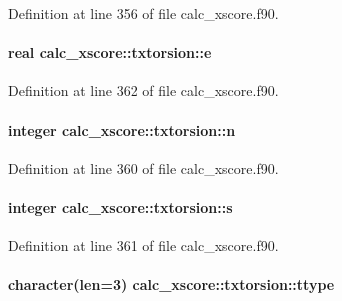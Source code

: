 Definition at line 356 of file calc\-\_\-xscore.\-f90.

\hypertarget{structcalc__xscore_1_1txtorsion_a9902e7ce0a1b1a905386ad7004774b2b}{
\paragraph[{e}]{\setlength{\rightskip}{0pt plus 5cm}real calc\-\_\-xscore\-::txtorsion\-::e}}\label{structcalc__xscore_1_1txtorsion_a9902e7ce0a1b1a905386ad7004774b2b}


Definition at line 362 of file calc\-\_\-xscore.\-f90.

\hypertarget{structcalc__xscore_1_1txtorsion_af40518b8daaef5dd86b51c55408a87e3}{
\paragraph[{n}]{\setlength{\rightskip}{0pt plus 5cm}integer calc\-\_\-xscore\-::txtorsion\-::n}}\label{structcalc__xscore_1_1txtorsion_af40518b8daaef5dd86b51c55408a87e3}


Definition at line 360 of file calc\-\_\-xscore.\-f90.

\hypertarget{structcalc__xscore_1_1txtorsion_a99e0387c10d669d8c749ff711df56683}{
\paragraph[{s}]{\setlength{\rightskip}{0pt plus 5cm}integer calc\-\_\-xscore\-::txtorsion\-::s}}\label{structcalc__xscore_1_1txtorsion_a99e0387c10d669d8c749ff711df56683}


Definition at line 361 of file calc\-\_\-xscore.\-f90.

\hypertarget{structcalc__xscore_1_1txtorsion_af349b0e6a8c9d9bae0474e91e130ceef}{
\paragraph[{ttype}]{\setlength{\rightskip}{0pt plus 5cm}character(len=3) calc\-\_\-xscore\-::txtorsion\-::ttype}}\label{structcalc__xscore_1_1txtorsion_af349b0e6a8c9d9bae0474e91e130ceef}


